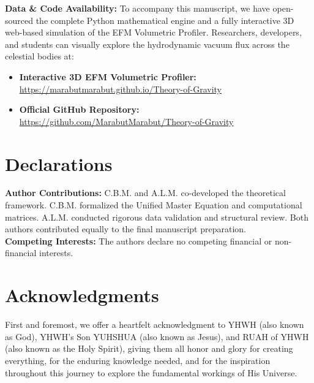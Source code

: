 \documentclass[11pt, a4paper]{article}
\begin{document}
  \vspace{1em}
  \noindent \textbf{Data \& Code Availability:} To accompany this manuscript, we have open-sourced the complete Python mathematical engine and a fully interactive 3D web-based simulation of the EFM Volumetric Profiler. Researchers, developers, and students can visually explore the hydrodynamic vacuum flux across the celestial bodies at: 
  \begin{itemize}
    \item \textbf{Interactive 3D EFM Volumetric Profiler:} \\ \url{https://marabutmarabut.github.io/Theory-of-Gravity}
    
    \item \textbf{Official GitHub Repository:} \\ \url{https://github.com/MarabutMarabut/Theory-of-Gravity}
  \end{itemize}

\clearpage
\section*{Declarations}
\textbf{Author Contributions:} C.B.M. and A.L.M. co-developed the theoretical framework. C.B.M. formalized the Unified Master Equation and computational matrices. A.L.M. conducted rigorous data validation and structural review. Both authors contributed equally to the final manuscript preparation. \\[0.5em]
\textbf{Competing Interests:} The authors declare no competing financial or non-financial interests.

\section*{Acknowledgments}
First and foremost, we offer a heartfelt acknowledgment to YHWH (also known as God), YHWH's Son YUHSHUA (also known as Jesus), and RUAH of YHWH (also known as the Holy Spirit), giving them all honor and glory for creating everything, for the enduring knowledge needed, and for the inspiration throughout this journey to explore the fundamental workings of His Universe.
\end{document}
